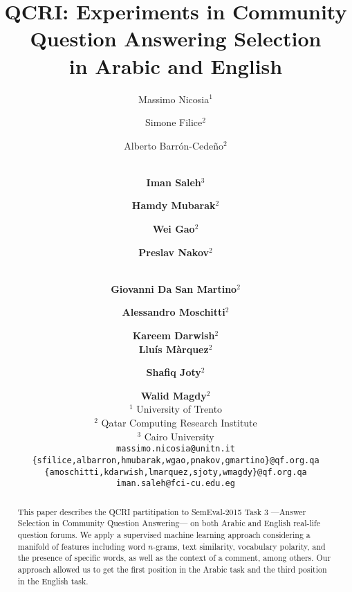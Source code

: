 \documentclass[11pt,letterpaper]{article}
\title{QCRI: Experiments in Community Question Answering Selection \\in Arabic 
and English
}
\author{%
Massimo Nicosia$^1$ \and Simone Filice$^2$ \and Alberto Barr\'on-Cede\~no$^2$ 
\and \\
{\bf Iman Saleh}$^3$  \and {\bf Hamdy Mubarak}$^2$ \and {\bf Wei Gao$^2$} \and 
{\bf Preslav Nakov$^2$}
\and \\
{\bf Giovanni Da San Martino$^2$} \and {\bf Alessandro Moschitti}$^2$	
\and  {\bf Kareem Darwish$^2$} \\ 
{\bf Llu\'is M\`arquez$^2$}  \and  
{\bf Shafiq Joty$^2$} \and {\bf Walid Magdy$^2$} \\
$^1$ University of Trento \\
$^2$ Qatar Computing Research Institute	\\
$^3$ Cairo University \\
{\tt massimo.nicosia@unitn.it}	\\
{\tt \{sfilice,albarron,hmubarak,wgao,pnakov,gmartino\}@qf.org.qa} 	\\
{\tt \{amoschitti,kdarwish,lmarquez,sjoty,wmagdy\}@qf.org.qa}	
\\
{\tt iman.saleh@fci-cu.edu.eg} 
% 
% 
% 
% 
% 
}
\date{}
\newcommand{\blue}{\textcolor{blue}}
\begin{document}
\maketitle
\begin{abstract}


This paper describes the QCRI partitipation to SemEval-2015 Task 3 ---Answer 
Selection in Community Question Answering--- on both Arabic and English 
real-life question forums. We apply a supervised machine learning approach 
considering a manifold of features including word $n$-grams, text similarity, 
vocabulary polarity, and the presence of specific words, as well as the 
context of a comment, 
among others.
% 
Our approach allowed us to get the first position in the Arabic task and the 
third position in the English task.
\end{abstract}


% 














% 
% 
% 
% 

\end{document}
